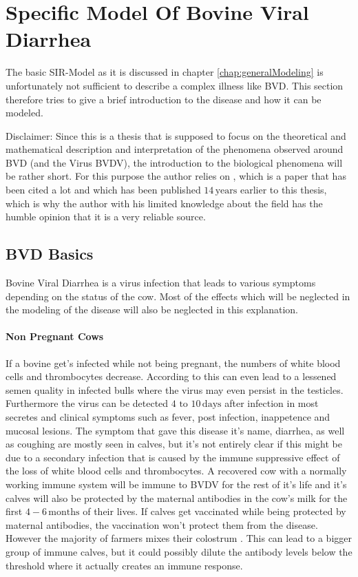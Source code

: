 \section{Specific Model Of Bovine Viral Diarrhea}
\label{chap:bvdModel}
The basic SIR-Model as it is discussed in chapter \ref{chap:generalModeling} is unfortunately not sufficient to describe a complex illness like BVD. This section therefore tries to give a brief introduction to the disease and how it can be modeled.

Disclaimer: Since this is a thesis that is supposed to focus on the theoretical and mathematical description and interpretation of the phenomena observed around BVD (and the Virus BVDV), the introduction to the biological phenomena will be rather short. For this purpose the author relies on \citep{LIN03}, which is a paper that has been cited a lot and which has been published $14\,\text{years}$ earlier to this thesis, which is why the author with his limited knowledge about the field has the humble opinion that it is a very reliable source.

\subsection{BVD Basics}\label{chap:bvdBasics}
Bovine Viral Diarrhea is a virus infection that leads to various symptoms depending on the status of the cow. Most of the effects which will be neglected in the modeling of the disease will also be neglected in this explanation.

\paragraph{Non Pregnant Cows} If a bovine get's infected while not being pregnant, the numbers of white blood cells and thrombocytes decrease. According to \citep{LIN03} this can even lead to a lessened semen quality in infected bulls where the virus may even persist in the testicles. Furthermore the virus can be detected $4 \text{ to } 10\,\text{days}$ after infection in most secretes and \glqq clinical symptoms such as fever, post infection, inappetence and mucosal lesions\grqq. The symptom that gave this disease it's name, diarrhea, as well as coughing are mostly seen in calves, but it's not entirely clear if this might be due to a secondary infection that is caused by the immune suppressive effect of the loss of white blood cells and thrombocytes.
A recovered cow with a normally working immune system will be immune to BVDV for the rest of it's life and it's calves will also be protected by the maternal antibodies in the cow's milk for the first $4-6\, \text{months}$ of their lives. If calves get vaccinated while being protected by maternal antibodies, the vaccination won't protect them from the disease. However the majority of farmers mixes their colostrum \citep{personalCom}. This can lead to a bigger group of immune calves, but it could possibly dilute the antibody levels below the threshold where it actually creates an immune response.

